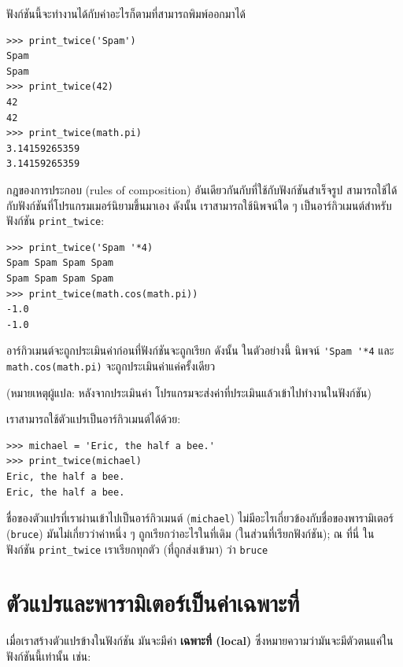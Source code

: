 ฟังก์ชันนี้จะทำงานได้กับค่าอะไรก็ตามที่สามารถพิมพ์ออกมาได้

\begin{verbatim}
>>> print_twice('Spam')
Spam
Spam
>>> print_twice(42)
42
42
>>> print_twice(math.pi)
3.14159265359
3.14159265359
\end{verbatim}
%
กฎของการประกอบ (rules of composition) อันเดียวกันกับที่ใช้กับฟังก์ชันสำเร็จรูป  
สามารถใช้ได้กับฟังก์ชันที่โปรแกรมเมอร์นิยามขึ้นมาเอง  ดังนั้น เราสามารถใช้นิพจน์ใด ๆ เป็นอาร์กิวเมนต์สำหรับ
ฟังก์ชัน \verb|print_twice|:

\begin{verbatim}
>>> print_twice('Spam '*4)
Spam Spam Spam Spam
Spam Spam Spam Spam
>>> print_twice(math.cos(math.pi))
-1.0
-1.0
\end{verbatim}
%
อาร์กิวเมนต์จะถูกประเมินค่าก่อนที่ฟังก์ชันจะถูกเรียก  ดังนั้น ในตัวอย่างนี้ นิพจน์ \verb"'Spam '*4"
และ {\tt math.cos(math.pi)} จะถูกประเมินค่าแค่ครั้งเดียว 

(หมายเหตุผู้แปล: หลังจากประเมินค่า โปรแกรมจะส่งค่าที่ประเมินแล้วเข้าไปทำงานในฟังก์ชัน)

เราสามารถใช้ตัวแปรเป็นอาร์กิวเมนต์ได้ด้วย:

\begin{verbatim}
>>> michael = 'Eric, the half a bee.'
>>> print_twice(michael)
Eric, the half a bee.
Eric, the half a bee.
\end{verbatim}
% 
ชื่อของตัวแปรที่เราผ่านเข้าไปเป็นอาร์กิวเมนต์ ({\tt michael}) ไม่มีอะไรเกี่ยวข้องกับชื่อของพารามิเตอร์ 
({\tt bruce}) มันไม่เกี่ยวว่าค่าหนึ่ง ๆ ถูกเรียกว่าอะไรในที่เดิม (ในส่วนที่เรียกฟังก์ชัน);
ณ ที่นี่ ในฟังก์ชัน \verb|print_twice| เราเรียกทุกตัว (ที่ถูกส่งเข้ามา) ว่า {\tt bruce}

\section{ตัวแปรและพารามิเตอร์เป็นค่าเฉพาะที่} %

เมื่อเราสร้างตัวแปรข้างในฟังก์ชัน มันจะมีค่า {\bf เฉพาะที่ (local)}
ซึ่งหมายความว่ามันจะมีตัวตนแค่ในฟังก์ชันนี้เท่านั้น เช่น:

